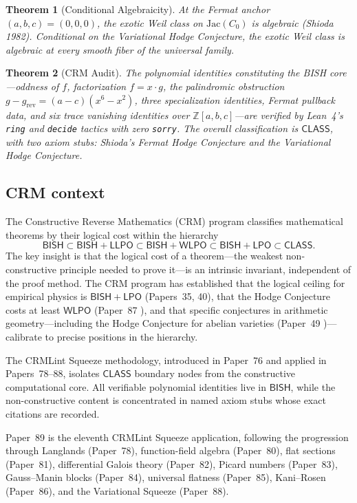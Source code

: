 \documentclass[11pt,a4paper]{article}
\newtheorem{theorem}{Theorem}[section]
\theoremstyle{definition}
\theoremstyle{remark}
\newcommand{\ZZ}{\mathbb{Z}}
\newcommand{\Jac}{\mathrm{Jac}}
\newcommand{\BISH}{\mathsf{BISH}}
\newcommand{\CLASS}{\mathsf{CLASS}}
\newcommand{\LPO}{\mathsf{LPO}}
\begin{document}
\begin{theorem}[Conditional Algebraicity]\label{thm:B}
At the Fermat anchor $(a,b,c) = (0,0,0)$, the exotic Weil class on $\Jac(C_0)$
is algebraic (Shioda 1982).
Conditional on the Variational Hodge Conjecture, the exotic Weil class is algebraic
at every smooth fiber of the universal family.
\end{theorem}

\begin{theorem}[CRM Audit]\label{thm:C}
The polynomial identities constituting the BISH core---oddness of $f$,
factorization $f = x \cdot g$, the palindromic obstruction $g - g_{\mathrm{rev}} = (a-c)(x^6-x^2)$,
three specialization identities, Fermat pullback data, and six trace vanishing
identities over $\ZZ[a,b,c]$---are verified by Lean~4's \texttt{ring} and
\texttt{decide} tactics with zero \texttt{sorry}.
The overall classification is $\CLASS$, with two axiom stubs:
Shioda's Fermat Hodge Conjecture and the Variational Hodge Conjecture.
\end{theorem}

\subsection{CRM context}

The Constructive Reverse Mathematics (CRM) program classifies mathematical
theorems by their logical cost within the hierarchy
\[
  \BISH \subset \BISH + \mathsf{LLPO} \subset \BISH + \mathsf{WLPO}
  \subset \BISH + \LPO \subset \CLASS.
\]
The key insight is that the logical cost of a theorem---the weakest
non-constructive principle needed to prove it---is an intrinsic invariant,
independent of the proof method.
The CRM program has established that the logical ceiling for empirical
physics is $\BISH + \LPO$ (Papers~35, 40), that the Hodge Conjecture
costs at least $\mathsf{WLPO}$ (Paper~87 \cite{Lee2025P87}), and that specific conjectures
in arithmetic geometry---including the Hodge Conjecture for abelian varieties
(Paper~49 \cite{Lee2025P49})---calibrate to precise positions in the hierarchy.

The CRMLint Squeeze methodology, introduced in Paper~76 and applied in
Papers~78--88, isolates $\CLASS$ boundary nodes from the constructive
computational core.
All verifiable polynomial identities live in $\BISH$, while the
non-constructive content is concentrated in named axiom stubs whose
exact citations are recorded.

Paper~89 is the eleventh CRMLint Squeeze application, following the
progression through Langlands (Paper~78), function-field algebra
(Paper~80), flat sections (Paper~81), differential Galois theory
(Paper~82), Picard numbers (Paper~83), Gauss--Manin blocks (Paper~84),
universal flatness (Paper~85), Kani--Rosen (Paper~86), and the
Variational Squeeze (Paper~88).
\end{document}
